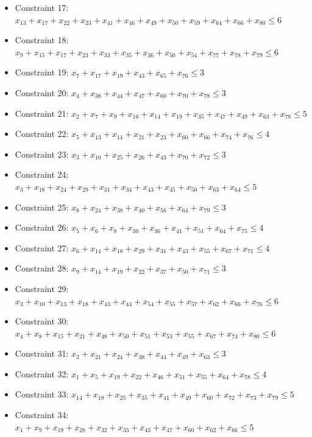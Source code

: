\documentclass[11pt]{article}
\begin{document}
\begin{itemize}
\item Constraint 17: $x_{13} + x_{17} + x_{22} + x_{23} + x_{41} + x_{46} + x_{49} + x_{50} + x_{59} + x_{64} + x_{66} + x_{80} \le 6$
\item Constraint 18: $x_{9} + x_{15} + x_{17} + x_{23} + x_{33} + x_{35} + x_{36} + x_{50} + x_{54} + x_{77} + x_{78} + x_{79} \le 6$
\item Constraint 19: $x_{7} + x_{17} + x_{19} + x_{43} + x_{65} + x_{76} \le 3$
\item Constraint 20: $x_{4} + x_{38} + x_{44} + x_{47} + x_{60} + x_{70} + x_{78} \le 3$
\item Constraint 21: $x_{2} + x_{7} + x_{9} + x_{10} + x_{14} + x_{19} + x_{35} + x_{47} + x_{49} + x_{63} + x_{78} \le 5$
\item Constraint 22: $x_{5} + x_{13} + x_{14} + x_{21} + x_{23} + x_{60} + x_{66} + x_{74} + x_{76} \le 4$
\item Constraint 23: $x_{3} + x_{10} + x_{25} + x_{26} + x_{43} + x_{70} + x_{72} \le 3$
\item Constraint 24: $x_{3} + x_{18} + x_{24} + x_{29} + x_{31} + x_{34} + x_{43} + x_{45} + x_{50} + x_{63} + x_{64} \le 5$
\item Constraint 25: $x_{8} + x_{24} + x_{38} + x_{40} + x_{56} + x_{64} + x_{79} \le 3$
\item Constraint 26: $x_{5} + x_{6} + x_{8} + x_{30} + x_{36} + x_{41} + x_{51} + x_{64} + x_{75} \le 4$
\item Constraint 27: $x_{6} + x_{14} + x_{18} + x_{29} + x_{31} + x_{43} + x_{55} + x_{67} + x_{71} \le 4$
\item Constraint 28: $x_{9} + x_{14} + x_{19} + x_{22} + x_{37} + x_{50} + x_{71} \le 3$
\item Constraint 29: $x_{3} + x_{10} + x_{13} + x_{18} + x_{43} + x_{44} + x_{54} + x_{55} + x_{57} + x_{62} + x_{66} + x_{76} \le 6$
\item Constraint 30: $x_{4} + x_{8} + x_{15} + x_{21} + x_{48} + x_{50} + x_{51} + x_{53} + x_{55} + x_{67} + x_{74} + x_{80} \le 6$
\item Constraint 31: $x_{3} + x_{21} + x_{24} + x_{38} + x_{44} + x_{49} + x_{63} \le 3$
\item Constraint 32: $x_{1} + x_{5} + x_{19} + x_{22} + x_{46} + x_{51} + x_{55} + x_{64} + x_{78} \le 4$
\item Constraint 33: $x_{14} + x_{18} + x_{25} + x_{35} + x_{41} + x_{49} + x_{60} + x_{72} + x_{73} + x_{79} \le 5$
\item Constraint 34: $x_{1} + x_{9} + x_{19} + x_{28} + x_{32} + x_{33} + x_{43} + x_{47} + x_{60} + x_{62} + x_{66} \le 5$

\end{itemize}
\end{document}
